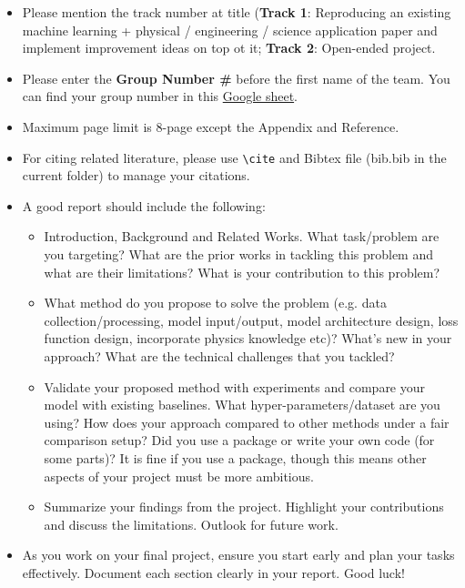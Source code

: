 \documentclass{article}
\begin{document}
\begin{itemize}
    \item Please mention the track number at title (\textbf{Track 1}: Reproducing an existing machine learning + physical / engineering / science application paper and implement improvement ideas on top ot it; \textbf{Track 2}: Open-ended project. 
    \item Please enter the \textbf{Group Number \#} before the first name of the team. You can find your group number in this  \href{https://docs.google.com/spreadsheets/d/1WOi940jN9U6ZHX3xf5tDbw3-igv2bbjXg1W5AETX8cI/edit?usp=sharing}{Google sheet}. 
    \item Maximum page limit is 8-page except the Appendix and Reference.
    \item For citing related literature, please use \verb+\cite+ and Bibtex file (bib.bib in the current folder) to manage your citations.
    \item A good report should include the following:
    \begin{itemize}
        \item Introduction, Background and Related Works. What task/problem are you targeting? What are the prior works in tackling this problem and what are their  limitations? What is your contribution to this problem?
        \item What method do you propose to solve the problem (e.g. data collection/processing, model input/output, model architecture design, loss function design, incorporate physics knowledge etc)? What's new in your approach? What are the technical challenges that you tackled? 
        \item Validate your proposed method with experiments and compare your model with existing baselines. What hyper-parameters/dataset are you using? How does your approach compared to other methods under a fair comparison setup? Did you use a package or write your own code (for some parts)? It is fine if you use a package, though this means other aspects of your project must be more ambitious.
        \item Summarize your findings from the project. Highlight your contributions and discuss the limitations. Outlook for future work.
    \end{itemize}
    \item As you work on your final project, ensure you start early and plan your tasks effectively. Document each section clearly in your report. Good luck!
\end{itemize}
\end{document}
